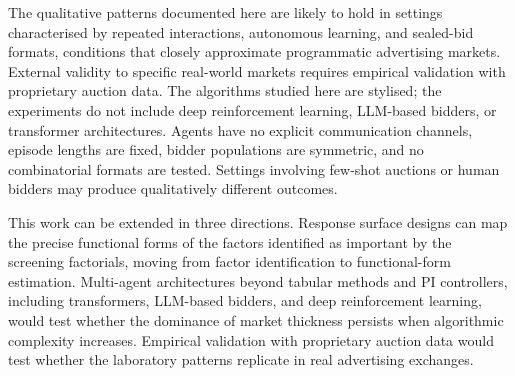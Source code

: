 The qualitative patterns documented here are likely to hold in settings characterised by repeated interactions, autonomous learning, and sealed-bid formats, conditions that closely approximate programmatic advertising markets. External validity to specific real-world markets requires empirical validation with proprietary auction data. The algorithms studied here are stylised; the experiments do not include deep reinforcement learning, LLM-based bidders, or transformer architectures. Agents have no explicit communication channels, episode lengths are fixed, bidder populations are symmetric, and no combinatorial formats are tested. Settings involving few-shot auctions or human bidders may produce qualitatively different outcomes.

This work can be extended in three directions. Response surface designs can map the precise functional forms of the factors identified as important by the screening factorials, moving from factor identification to functional-form estimation. Multi-agent architectures beyond tabular methods and PI controllers, including transformers, LLM-based bidders, and deep reinforcement learning, would test whether the dominance of market thickness persists when algorithmic complexity increases. Empirical validation with proprietary auction data would test whether the laboratory patterns replicate in real advertising exchanges.
